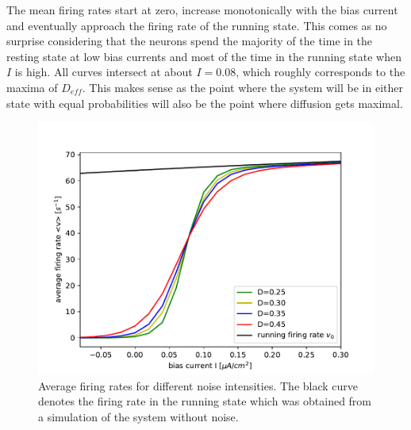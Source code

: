 \documentclass[12pt,a4paper]{article}
\begin{document}
The mean firing rates start at zero, increase monotonically with the bias current and eventually approach the firing rate of the running state. This comes as no surprise considering that the neurons spend the majority of the time in the resting state at low bias currents and most of the time in the running state when $I$ is high. All curves intersect at about $I=0.08$, which roughly corresponds to the maxima of $D_{eff}$. This makes sense as the point where the system will be in either state with equal probabilities will also be the point where diffusion gets maximal.
\begin{figure}[H]
	\centering
	\includegraphics[scale=1]{gneursh3realfast19jjem2strealfast13aem2n4realfast11jjem2sh.pdf}\caption{Average firing rates for different noise intensities. The black curve denotes the firing rate in the running state which was obtained from a simulation of the system without noise.}
	\label{rate}
\end{figure}
\end{document}
